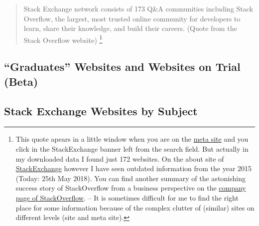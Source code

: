 \documentclass[]{book}
\let\rmarkdownfootnote\footnote%
\def\footnote{\protect\rmarkdownfootnote}
\theoremstyle{definition}
\theoremstyle{definition}
\theoremstyle{definition}
\theoremstyle{remark}
\begin{document}
\begin{quote}
Stack Exchange network consists of 173 Q\&A communities including Stack
Overflow, the largest, most trusted online community for developers to
learn, share their knowledge, and build their careers. (Quote from the
Stack Overflow website) \footnote{This quote apears in a little window
  when you are on the \href{https://meta.stackexchange.com}{meta site}
  and you click in the StackExchange banner left from the search field.
  But actually in my downloaded data I found just 172 websites. On the
  about site of \href{https://stackexchange.com/about}{StackExchange}
  however I have seen outdated information from the year 2015 (Today:
  25th May 2018). You can find another summary of the astonishing
  success story of StackOverflow from a business perspective on the
  \href{https://stackoverflow.com/company}{company page of
  StackOverflow}. -- It is sometimes difficult for me to find the right
  place for some information because of the complex clutter of (similar)
  sites on different levels (site and meta site).}
\end{quote}

\subsection{\texorpdfstring{``Graduates'' Websites and Websites on Trial
(Beta)}{Graduates Websites and Websites on Trial (Beta)}}\label{graduates-websites-and-websites-on-trial-beta}

\subsection{Stack Exchange Websites by
Subject}\label{stack-exchange-websites-by-subject}
\end{document}
